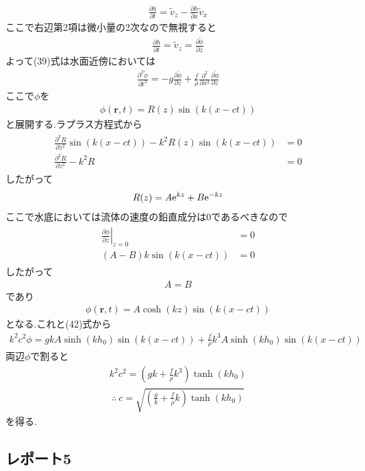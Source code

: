 \documentclass[uplatex,a4j,11pt,dvipdfmx]{jsarticle}
\begin{document}
\begin{align}
  \frac{\partial{h}}{\partial t}=\tilde{v}_z-\frac{\partial{h}}{\partial x}\tilde{v}_x
\end{align}
ここで右辺第2項は微小量の2次なので無視すると
\begin{align}
  \frac{\partial{h}}{\partial t}=\tilde{v}_z=\frac{\partial\tilde{\phi}}{\partial z}
\end{align}
よって(39)式は水面近傍においては
\begin{align}
  \frac{\partial^2\tilde{\phi}}{\partial t^2}=-g\frac{\partial\tilde{\phi}}{\partial z}+\frac{f}{\rho}\frac{\partial^2}{\partial x^2}\frac{\partial\tilde{\phi}}{\partial z}
\end{align}
ここで$\phi$を
\begin{align}
  \phi({\bm r},t)=R(z)\sin(k(x-ct))
\end{align}
と展開する.ラプラス方程式から
\begin{align}
  \begin{split}
    \frac{\partial^2 R}{\partial z^2}\sin(k(x-ct))-k^2R(z)\sin(k(x-ct))&=0\\
    \frac{\partial^2 R}{\partial z^2}-k^2R&=0
  \end{split}
\end{align}
したがって
\begin{align}
  R(z)=A{\rm e}^{kz}+B{\rm e}^{-kz}
\end{align}
ここで水底においては流体の速度の鉛直成分は0であるべきなので
\begin{align}
  \begin{split}
  \left.\frac{\partial\phi}{\partial z}\right|_{z=0}&=0\\
  (A-B)k\sin(k(x-ct))&=0
  \end{split}
\end{align}
したがって
\begin{align}
  A=B
\end{align}
であり
\begin{align}
  \phi({\bm r},t)=A\cosh(kz)\sin(k(x-ct))
\end{align}
となる.これと(42)式から
\begin{align}
  k^2c^2\phi=gkA\sinh(kh_0)\sin(k(x-ct))+\frac{f}{\rho}k^3A\sinh(kh_0)\sin(k(x-ct))
\end{align}
両辺$\phi$で割ると
\begin{align}
  k^2c^2=\left(gk+\frac{f}{\rho}k^3\right)\tanh(kh_0)
\end{align}
\begin{align}
  \therefore\ c=\sqrt{\left(\frac{g}{k}+\frac{f}{\rho}k\right)\tanh(kh_0)}
\end{align}
を得る.
\subsection*{レポート5}

\end{document}

